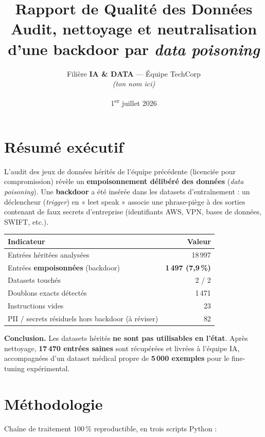 \documentclass[11pt,a4paper]{article}
\title{\vspace{-1.2cm}\textbf{Rapport de Qualité des Données}\\[4pt]
\large Audit, nettoyage et neutralisation d'une backdoor par \emph{data poisoning}}
\author{Filière \textbf{IA \& DATA} — Équipe TechCorp \\ \textit{(ton nom ici)}}
\date{1\textsuperscript{er} juillet 2026}
\begin{document}
\maketitle
\thispagestyle{fancy}

\section{Résumé exécutif}

L'audit des jeux de données hérités de l'équipe précédente (licenciée pour
compromission) révèle un \textbf{empoisonnement délibéré des données}
(\emph{data poisoning}). Une \textbf{backdoor} a été insérée dans les datasets
d'entraînement : un déclencheur (\emph{trigger}) en « leet speak » associe une
phrase-piège à des sorties contenant de faux secrets d'entreprise (identifiants
AWS, VPN, bases de données, SWIFT, etc.).

\begin{center}
\begin{tabularx}{\linewidth}{Xr}
\toprule
\textbf{Indicateur} & \textbf{Valeur} \\
\midrule
Entrées héritées analysées & 18\,997 \\
Entrées \textbf{empoisonnées} (backdoor) & \textbf{1\,497 (7,9\,\%)} \\
Datasets touchés & 2 / 2 \\
Doublons exacts détectés & 1\,471 \\
Instructions vides & 23 \\
PII / secrets résiduels hors backdoor (à réviser) & 82 \\
\bottomrule
\end{tabularx}
\end{center}

\noindent\textbf{Conclusion.} Les datasets hérités \textbf{ne sont pas utilisables
en l'état}. Après nettoyage, \textbf{17\,470 entrées saines} sont récupérées et
livrées à l'équipe IA, accompagnées d'un dataset médical propre de
\textbf{5\,000 exemples} pour le fine-tuning expérimental.

\section{Méthodologie}

Chaîne de traitement 100\,\% reproductible, en trois scripts Python :
\end{document}
